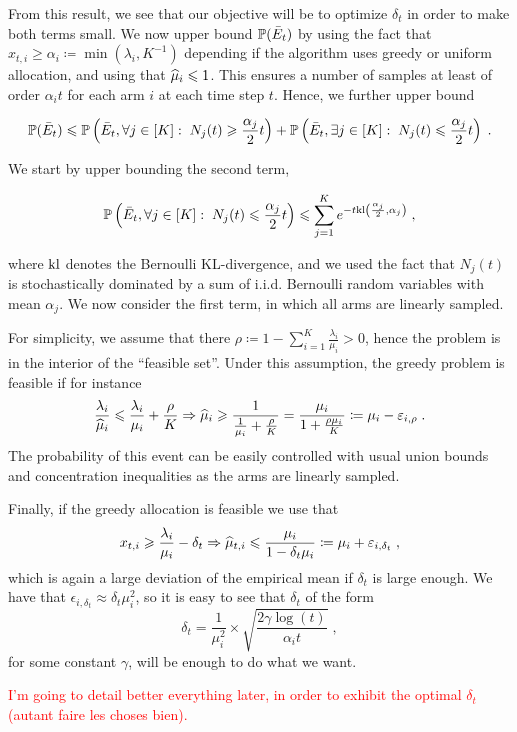 From this result, we see that our objective will be to optimize $\delta_t$ in order to make both terms small. We now upper bound $\mathbb{P}(\bar E_t)$ by using the fact that $x_{t,i}\geq \alpha_i \coloneqq \min(\lambda_i, K^{-1})$ depending if the algorithm uses greedy or uniform allocation, and using that $\widehat{\mu}_i\leqslant 1$. This ensures a number of samples at least of order $\alpha_i t$ for each arm $i$ at each time step $t$. Hence, we further upper bound 

\[\mathbb{P}(\bar E_t) \leqslant \mathbb{P}\left(\bar E_t, \forall j \in [K]:\; N_j(t)\geqslant \frac{\alpha_j}{2}t\right) + \mathbb{P}\left(\bar E_t, \exists j \in [K]:\; N_j(t)\leqslant \frac{\alpha_j}{2}t\right) \;. \]  

We start by upper bounding the second term, 

\begin{align*}
\mathbb{P}\left(\bar E_t, \forall j \in [K]:\; N_j(t) \leqslant  \frac{\alpha_j}{2}t\right) \leqslant \sum_{j=1}^K e^{-t \text{\normalfont kl}\left(\frac{\alpha_j}{2}, \alpha_j\right)} \;,
\end{align*}

where $\text{\normalfont kl}$ denotes the Bernoulli KL-divergence, and we used the fact that $N_j(t)$ is stochastically dominated by a sum of i.i.d. Bernoulli random variables with mean $\alpha_j$. We now consider the first term, in which all arms are linearly sampled.

For simplicity, we assume that there $\rho \coloneqq 1- \sum_{i=1}^K \frac{\lambda_i}{\mu_i}>0$, hence the problem is in the interior of the ``feasible set''. Under this assumption, the greedy problem is feasible if for instance \[\frac{\lambda_i}{\widehat{\mu}_i}\leqslant \frac{\lambda_i}{\mu_i}+ \frac{\rho}{K} \Rightarrow \widehat{\mu}_i \geqslant \frac{1}{\frac{1}{\mu_i}+\frac{\rho}{K}}=\frac{\mu_i}{1+\frac{\rho \mu_i}{K}}\coloneqq \mu_i - \varepsilon_{i, \rho}\;.\]
The probability of this event can be easily controlled with usual union bounds and concentration inequalities as the arms are linearly sampled. 

Finally, if the greedy allocation is feasible we use that
\[x_{t,i} \geqslant \frac{\lambda_i}{\mu_i} - \delta_t \Rightarrow \widehat{\mu}_{t,i} \leqslant \frac{\mu_i}{1-\delta_t \mu_i} \coloneqq \mu_i + \varepsilon_{i, \delta_t} \;, \]
which is again a large deviation of the empirical mean if $\delta_t$ is large enough. We have that $\epsilon_{i, \delta_t} \approx \delta_t \mu_i^2$, so it is easy to see that $\delta_t$ of the form \[\delta_t = \frac{1}{\mu_i^2} \times \sqrt{\frac{2\gamma \log(t)}{\alpha_i t}}\;,\] 
for some constant $\gamma$, will be enough to do what we want.

\textcolor{red}{I'm going to detail better everything later, in order to exhibit the optimal $\delta_t$ (autant faire les choses bien).}













